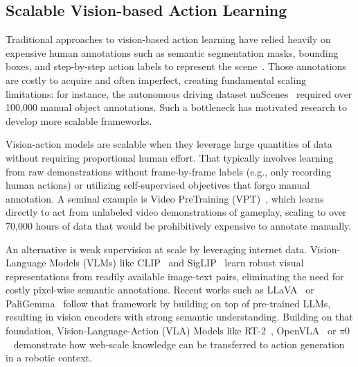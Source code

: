 \subsection{Scalable Vision-based Action Learning}

Traditional approaches to vision-based action learning have relied heavily on expensive human annotations such as semantic segmentation masks, bounding boxes, and step-by-step action labels to represent the scene~\cite{hu2022mile,hu2023uniad}.
Those annotations are costly to acquire and often imperfect, creating fundamental scaling limitations: for instance, the autonomous driving dataset nuScenes~\cite{caesar2020nuscenes} required over 100,000 manual object annotations. Such a bottleneck has motivated research to develop more scalable frameworks.

Vision-action models are scalable when they leverage large quantities of data without requiring proportional human effort. That typically involves learning from raw demonstrations without frame-by-frame labels (e.g., only recording human actions) or utilizing self-supervised objectives that forgo manual annotation. A seminal example is Video PreTraining (VPT)~\cite{baker2022vpt}, which learns directly to act from unlabeled video demonstrations of gameplay, scaling to over 70,000 hours of data that would be prohibitively expensive to annotate manually.

An alternative is weak supervision at scale by leveraging internet data. Vision-Language Models (VLMs) like CLIP~\cite{radford2021clip} and SigLIP~\cite{whai2023siglip} learn robust visual representations from readily available image-text pairs, eliminating the need for costly pixel-wise semantic annotations. Recent works such as LLaVA~\cite{liu2023llava} or PaliGemma~\cite{beyer2024paligemma} follow that framework by building on top of pre-trained LLMs, resulting in vision encoders with strong semantic understanding. Building on that foundation, Vision-Language-Action (VLA) Models like RT-2~\cite{zitkovich2023rt2}, OpenVLA~\cite{kim2024openvla} or $\pi0$~\cite{black2024pi0} demonstrate how web-scale knowledge can be transferred to action generation in a robotic context.

